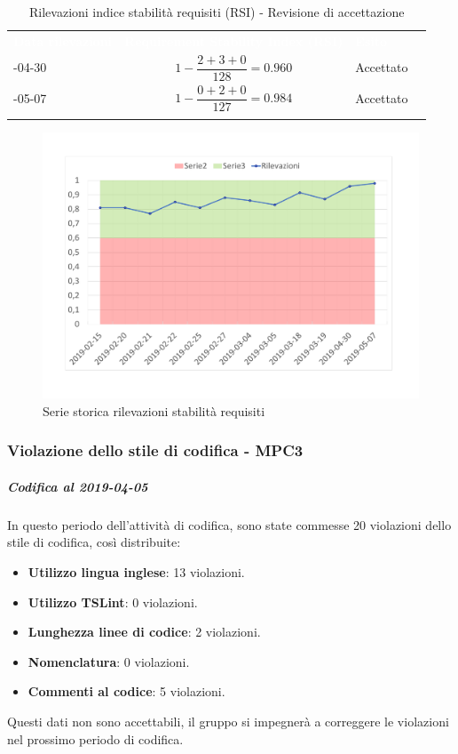 \begin{longtable}{>{\centering\arraybackslash}m{3cm} >{\centering\arraybackslash}m{4cm} >{\centering\arraybackslash}m{5cm} >{\centering\arraybackslash}m{2cm}}
	\rowcolor{LightBlue}
	\textbf{\textcolor{white}{Data rilevazioni}}
	& \textbf{\textcolor{white}{Requirement Stability Index (RSI)}}
	& \textbf{\textcolor{white}{Esito}}\\
	2019-04-30 & \[1-\frac{2+3+0}{128}=0.960\] & Accettato\\
	\hline
	2019-05-07 & \[1-\frac{0+2+0}{127}=0.984\] & Accettato\\
	\hline
	\caption{Rilevazioni indice stabilità requisiti (RSI) - Revisione di accettazione}
\end{longtable}

\begin{figure}[H]
	\centering
	\includegraphics[scale=0.6]{images/resoconto/MPC2Chart.pdf}
	\caption{Serie storica rilevazioni stabilità requisiti}	
\end{figure}


\subsubsection{Violazione dello stile di codifica - MPC3}

\subparagraph{Codifica al 2019-04-05}
In questo periodo dell'attività di codifica, sono state commesse 20 violazioni dello stile di codifica, così distribuite:
 \begin{itemize}
 	\item \textbf{Utilizzo lingua inglese}: 13 violazioni.
 	\item \textbf{Utilizzo TSLint}: 0 violazioni.
 	\item \textbf{Lunghezza linee di codice}: 2 violazioni.
 	\item \textbf{Nomenclatura}: 0 violazioni.
 	\item \textbf{Commenti al codice}: 5 violazioni.
 \end{itemize}
Questi dati non sono accettabili, il gruppo si impegnerà a correggere le violazioni nel prossimo periodo di codifica.

